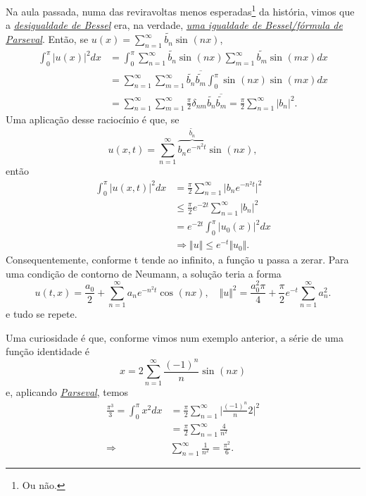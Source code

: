 \documentclass[../pde_notes.tex]{subfiles}
\begin{document}
Na aula passada, numa das reviravoltas menos esperadas\footnote{Ou não.} da história, vimos que a \hyperlink{bessel_inequality}{\textit{desigualdade de Bessel}} era, na verdade, \hyperlink{parseval_formula}{\textit{uma igualdade de Bessel/fórmula de Parseval}}. Então, se \(u(x) = \sum\limits_{n=1}^{\infty}\tilde{b_{n}}\sin^{}{(nx)}\),
\begin{align*}
	\int_{0}^{\pi }|u(x)|^{2}dx & = \int_{0}^{\pi }\sum\limits_{n=1}^{\infty}\widetilde{b_{n}}\sin^{}{(nx)}\sum\limits_{m=1}^{\infty}\widetilde{b_{m}}\sin^{}{(mx)}dx                                                 \\
	                            & =\sum\limits_{n=1}^{\infty}\sum\limits_{m=1}^{\infty}\widetilde{b_{n}}\overline{\widetilde{b_{m}}}\int_{0}^{\pi }\sin^{}{(nx)}\sin^{}{(mx)}dx                                       \\
	                            & = \sum\limits_{n=1}^{\infty}\sum\limits_{m=1}^{\infty}\frac{\pi }{2}\delta_{nm}\widetilde{b_{n}}\overline{\widetilde{b_{m}}} = \frac{\pi }{2}\sum\limits_{n=1}^{\infty}|b_{n}|^{2}.
\end{align*}
Uma aplicação desse raciocínio é que, se
\[
	u(x, t) = \sum\limits_{n=1}^{\infty}\overbrace{b_{n}e^{-n^{2}t}}^{\widetilde{b_{n}}}\sin^{}{(nx)},
\]
então
\begin{align*}
	\int_{0}^{\pi }|u(x, t)|^{2}dx & = \frac{\pi }{2}\sum\limits_{n=1}^{\infty}\biggl\vert b_{n}e^{-n^{2}t} \biggr\vert^{2} \\
	                               & \leq \frac{\pi }{2}e^{-2t}\sum\limits_{n=1}^{\infty}|b_{n}|^{2}                        \\
	                               & = e^{-2t}\int_{0}^{\pi }|u_{0}(x)|^{2}dx                                               \\
	                               & \Rightarrow \Vert u \Vert\leq e^{-t}\Vert u_{0} \Vert.
\end{align*}
Consequentemente, conforme t tende ao infinito, a função u passa a zerar. Para uma condição de contorno de Neumann, a solução teria a forma
\[
	u(t, x) = \frac{a_{0}}{2} + \sum\limits_{n=1}^{\infty}a_{n}e^{-n^{2}t}\cos^{}{(nx)}, \quad \Vert u \Vert^{2}=\frac{a_{0}^{2}\pi }{4} + \frac{\pi }{2}e^{-t}\sum\limits_{n=1}^{\infty}a_{n}^{2}.
\]
e tudo se repete.

Uma curiosidade é que, conforme vimos num exemplo anterior, a série de uma função identidade é
\[
	x = 2\sum\limits_{n=1}^{\infty}\frac{(-1)^{n}}{n}\sin^{}{(nx)}
\]
e, aplicando \hyperlink{parseval_formula}{\textit{Parseval}}, temos
\begin{align*}
	\frac{\pi^{3}}{3} = \int_{0}^{\pi }x^{2}dx & = \frac{\pi }{2}\sum\limits_{n=1}^{\infty}\biggl\vert \frac{(-1)^{n}}{n}2 \biggr\vert^{2} \\
	                                           & = \frac{\pi }{2}\sum\limits_{n=1}^{\infty}\frac{4}{n^{2}}                                 \\
	\Rightarrow                                & \sum\limits_{n=1}^{\infty}\frac{1}{n^{2}}=\frac{\pi^{2}}{6}.
\end{align*}
\end{document}

